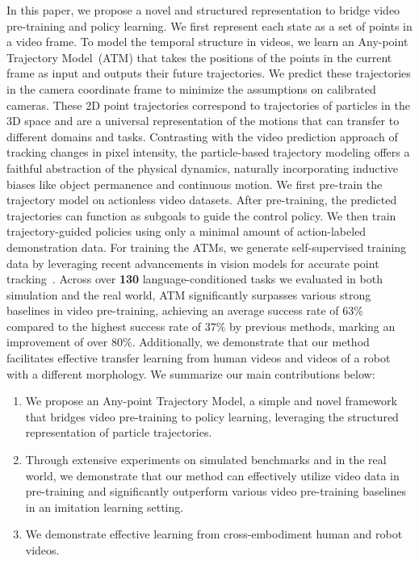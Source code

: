 In this paper, we propose a novel and structured representation to bridge video pre-training and policy learning. We first represent each state as a set of points in a video frame. To model the temporal structure in videos, we learn an Any-point Trajectory Model~(ATM) that takes the positions of the points in the current frame as input and outputs their future trajectories. We predict these trajectories in the camera coordinate frame to minimize the assumptions on calibrated cameras. These 2D point trajectories correspond to trajectories of particles in the 3D space and are a universal representation of the motions that can transfer to different domains and tasks. Contrasting with the video prediction approach of tracking changes in pixel intensity, the particle-based trajectory modeling offers a faithful abstraction of the physical dynamics, naturally incorporating inductive biases like object permanence and continuous motion. We first pre-train the trajectory model on actionless video datasets. After pre-training, the predicted trajectories can function as subgoals to guide the control policy. We then train trajectory-guided policies using only a minimal amount of action-labeled demonstration data. For training the ATMs, we generate self-supervised training data by leveraging recent advancements in vision models for accurate point tracking~\cite{karaev2023cotracker}. Across over \textbf{130} language-conditioned tasks we evaluated in both simulation and the real world, ATM significantly surpasses various strong baselines in video pre-training, achieving an average success rate of $63\%$ compared to the highest success rate of $37\%$ by previous methods, marking an improvement of over $80\%$. Additionally, we demonstrate that our method facilitates effective transfer learning from human videos and videos of a robot with a different morphology. We summarize our main contributions below:
\begin{enumerate}
  \item We propose an Any-point Trajectory Model, a simple and novel framework that bridges video pre-training to policy learning, leveraging the structured representation of particle trajectories.
  \item Through extensive experiments on simulated benchmarks and in the real world, we demonstrate that our method can effectively utilize video data in pre-training and significantly outperform various video pre-training baselines in an imitation learning setting.
  \item We demonstrate effective learning from cross-embodiment human and robot videos.
\end{enumerate}

